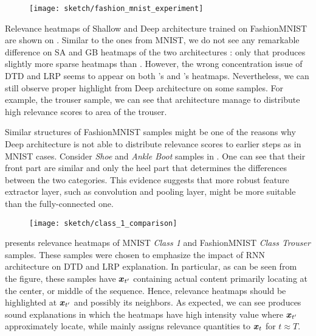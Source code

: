  \begin{figure}[!htb]
\centering
\texttt{[image: sketch/fashion\_mnist\_experiment]}
\label{fig:fashion_mnist_experiment}
\end{figure}

Relevance heatmaps of Shallow and Deep architecture trained on  FashionMNIST  are shown on \addfigure{\ref{fig:fashion_mnist_experiment}}. Similar to the ones from MNIST, we do not see any remarkable difference on SA and GB heatmaps of the two architectures : only that  produces slightly more sparse heatmaps than . However, the wrong concentration issue of DTD and LRP seems to appear on both 's and 's heatmaps. Nevertheless, we can still observe proper highlight from Deep architecture on some samples. For example, the trouser sample, we can see  that  architecture manage to distribute high relevance scores to area of the trouser. 

Similar structures of FashionMNIST samples might be one of the reasons why Deep architecture is not able to distribute relevance scores to earlier steps as in MNIST cases. Consider \textit{Shoe} and \textit{Ankle Boot} samples in \addfigure{\ref{fig:fashion_mnist_samples}}. One can see that  their front part are similar and only the heel part that determines the differences between the two categories. This evidence suggests that  more robust feature extractor layer, such as convolution and pooling layer, might be more suitable than the fully-connected one.


 \begin{figure}[!htb]
\centering
\texttt{[image: sketch/class\_1\_comparison]}
\label{fig:class_1_comparison}
\end{figure}

\addfigure{\ref{fig:class_1_comparison}} presents relevance heatmaps of MNIST \textit{Class 1} and FashionMNIST \textit{Class Trouser} samples. These samples were chosen to emphasize the impact of RNN architecture on DTD and LRP explanation. In particular,  as can be seen from the figure, these samples have $\boldsymbol{x}_{t'}$ containing actual content  primarily locating at the center, or middle of the sequence. Hence, relevance heatmaps should be highlighted at $\boldsymbol{x}_{t'}$ and possibly its neighbors.  As expected, we can see  produces sound explanations in which the heatmaps have high intensity value where $\boldsymbol{x}_{t'}$ approximately locate, while  mainly assigns relevance quantities to $\boldsymbol{x}_{t}$ for $t \approx T$. 

